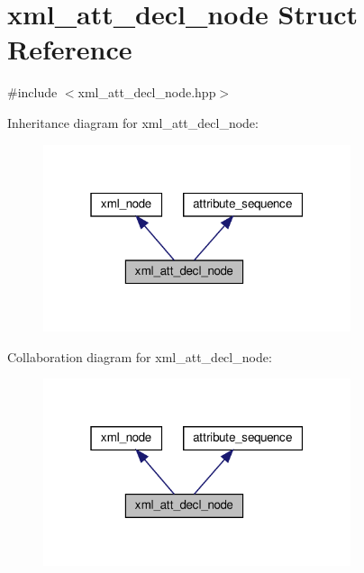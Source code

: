 \hypertarget{structxml__att__decl__node}{}\section{xml\+\_\+att\+\_\+decl\+\_\+node Struct Reference}
\label{structxml__att__decl__node}


{\ttfamily \#include $<$xml\+\_\+att\+\_\+decl\+\_\+node.\+hpp$>$}



Inheritance diagram for xml\+\_\+att\+\_\+decl\+\_\+node\+:
\nopagebreak
\begin{figure}[H]
\begin{center}
\leavevmode
\includegraphics[width=256pt]{d7/dff/structxml__att__decl__node__inherit__graph}
\end{center}
\end{figure}


Collaboration diagram for xml\+\_\+att\+\_\+decl\+\_\+node\+:
\nopagebreak
\begin{figure}[H]
\begin{center}
\leavevmode
\includegraphics[width=256pt]{d4/d4e/structxml__att__decl__node__coll__graph}
\end{center}
\end{figure}
